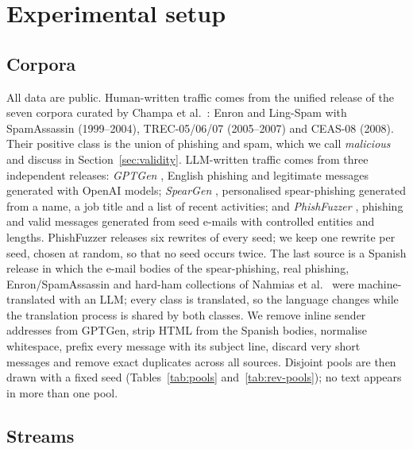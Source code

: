 \section{Experimental setup}\label{sec:setup}

\subsection{Corpora}
All data are public. Human-written traffic comes from the unified release \cite{ds_seven} of the seven corpora curated by Champa et al.\ \cite{champa2024}: Enron and Ling-Spam with SpamAssassin (1999--2004), TREC-05/06/07 (2005--2007) and CEAS-08 (2008). Their positive class is the union of phishing and spam, which we call \emph{malicious} and discuss in Section~\ref{sec:validity}. LLM-written traffic comes from three independent releases: \emph{GPTGen} \cite{ds_gptgen}, English phishing and legitimate messages generated with OpenAI models; \emph{SpearGen} \cite{ds_spear}, personalised spear-phishing generated from a name, a job title and a list of recent activities; and \emph{PhishFuzzer} \cite{toth2025phishfuzzer,ds_phishfuzzer}, phishing and valid messages generated from seed e-mails with controlled entities and lengths. PhishFuzzer releases six rewrites of every seed; we keep one rewrite per seed, chosen at random, so that no seed occurs twice. The last source is a Spanish release \cite{ds_spanish} in which the e-mail bodies of the spear-phishing, real phishing, Enron/SpamAssassin and hard-ham collections of Nahmias et al.\ \cite{nahmias2024} were machine-translated with an LLM; every class is translated, so the language changes while the translation process is shared by both classes. We remove inline sender addresses from GPTGen, strip HTML from the Spanish bodies, normalise whitespace, prefix every message with its subject line, discard very short messages and remove exact duplicates across all sources. Disjoint pools are then drawn with a fixed seed (Tables~\ref{tab:pools} and~\ref{tab:rev-pools}); no text appears in more than one pool.




\subsection{Streams}
